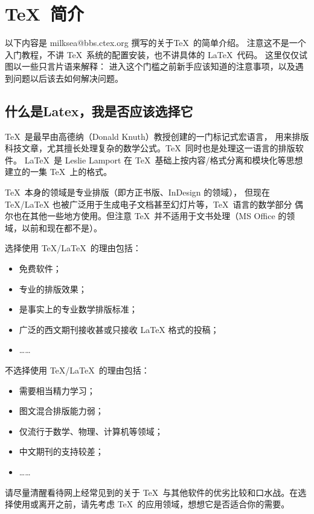 \clearpage

\section{\TeX\ 简介}

以下内容是 milksea@bbs.ctex.org 撰写的关于\TeX\ 的简单介绍。
注意这不是一个入门教程，不讲 \TeX\ 系统的配置安装，也不讲具体的 \LaTeX\ 代码。
这里仅仅试图以一些只言片语来解释：
进入这个门槛之前新手应该知道的注意事项，以及遇到问题以后该去如何解决问题。

\subsection{什么是Latex，我是否应该选择它}

\TeX\ 是最早由高德纳（Donald Knuth）教授创建的一门标记式宏语言，
用来排版科技文章，尤其擅长处理复杂的数学公式。\TeX\ 同时也是处理这一语言的排版软件。
\LaTeX\ 是 Leslie Lamport 在 \TeX\ 基础上按内容/格式分离和模块化等思想建立的一集 \TeX\ 上的格式。

\TeX\ 本身的领域是专业排版（即方正书版、InDesign 的领域），
但现在 TeX/LaTeX 也被广泛用于生成电子文档甚至幻灯片等，\TeX\ 语言的数学部分
偶尔也在其他一些地方使用。但注意 \TeX\ 并不适用于文书处理（MS Office 的领域，以前和现在都不是）。

选择使用 \TeX/\LaTeX\ 的理由包括：
\begin{itemize}
\item 免费软件；
\item 专业的排版效果；
\item 是事实上的专业数学排版标准；
\item 广泛的西文期刊接收甚或只接收 LaTeX 格式的投稿；
\item[] ……
\end{itemize}
不选择使用 \TeX/\LaTeX\ 的理由包括：
\begin{itemize}
\item 需要相当精力学习；
\item 图文混合排版能力弱；
\item 仅流行于数学、物理、计算机等领域；
\item 中文期刊的支持较差；
\item[] ……
\end{itemize}

请尽量清醒看待网上经常见到的关于 \TeX\ 与其他软件的优劣比较和口水战。在选择使用或离开之前，请先考虑
\TeX\ 的应用领域，想想它是否适合你的需要。

\def\AAAA{}

